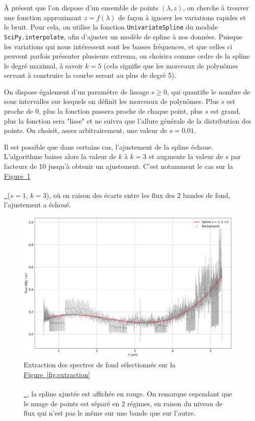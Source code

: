 \documentclass[12pt, a4paper]{article}
\newcommand*{\figref}[2][]{%
  \hyperref[{#2}]{%
    Figure~\ref*{#2}%
    \ifx\\#1\\%
    \else
      \,#1%
    \fi
  }%
}
\begin{document}
À présent que l'on dispose d'un ensemble de points $(\lambda, z)$, on cherche à trouver une fonction approximant $z = f(\lambda)$ de façon à ignorer les variations rapides et le bruit. Pour cela, on utilise la fonction \texttt{UnivariateSpline} du module \texttt{SciPy.interpolate}, afin d'ajuster un modèle de spline à nos données. Puisque les variations qui nous intéressent sont les basses fréquences, et que celles ci peuvent parfois présenter plusieurs extrema, on choisira comme ordre de la spline le degré maximal, à savoir $k=5$ (cela signifie que les morceaux de polynômes servant à construire la courbe seront au plus de degré 5). 

On dispose également d'un paramètre de lissage $s \geq 0$, qui quantifie le nombre de sous intervalles sur lesquels on définit les morceaux de polynômes. Plus $s$ est proche de 0, plus la fonction passera proche de chaque point, plus $s$ est grand, plus la fonction sera "lisse" et ne suivra que l'allure générale de la distribution des points. On choisit, assez arbitrairement, une valeur de $s=0.01$.

Il est possible que dans certains cas, l'ajustement de la spline échoue. L'algorithme baisse alors la valeur de $k$ à $k=3$ et augmente la valeur de $s$ par facteurs de 10 jusqu'à obtenir un ajustement. C'est notamment le cas sur la \figref{fig:spline_fit} ($s=1$, $k=3$), où en raison des écarts entre les flux des 2 bandes de fond, l'ajustement a échoué.

\begin{figure}[H]
  \centering
  \includegraphics[scale=0.45]{assets/fit_spline.png}
  \caption{Extraction des spectres de fond sélectionnés sur la \figref{fig:extraction}, la spline ajustée est affichée en rouge. On remarque cependant que le nuage de points est séparé en 2 régimes, en raison du niveau de flux qui n'est pas le même sur une bande que sur l'autre.}
  \label{fig:spline_fit}
\end{figure}
\end{document}
